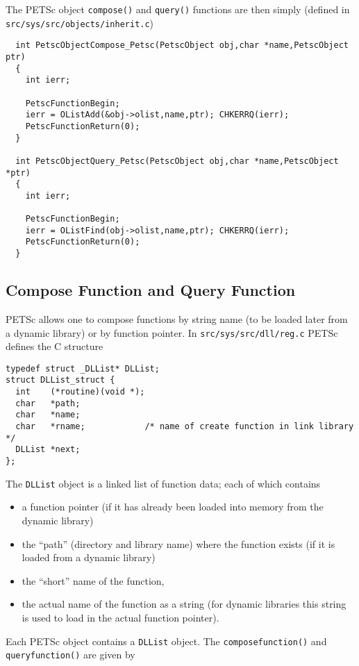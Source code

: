 The PETSc object {\tt compose()} and {\tt query()} functions are then simply
(defined in {\tt src/sys/src/objects/inherit.c})
\begin{verbatim}
  int PetscObjectCompose_Petsc(PetscObject obj,char *name,PetscObject ptr)
  {
    int ierr;

    PetscFunctionBegin;
    ierr = OListAdd(&obj->olist,name,ptr); CHKERRQ(ierr);
    PetscFunctionReturn(0);
  }

  int PetscObjectQuery_Petsc(PetscObject obj,char *name,PetscObject *ptr)
  {
    int ierr;

    PetscFunctionBegin;
    ierr = OListFind(obj->olist,name,ptr); CHKERRQ(ierr);
    PetscFunctionReturn(0); 
  }
\end{verbatim}

\subsection{Compose Function and Query Function}

PETSc allows one to compose functions by string name (to be loaded later from 
a dynamic library) or by function pointer. In {\tt src/sys/src/dll/reg.c}
PETSc defines the C structure

\begin{verbatim}
typedef struct _DLList* DLList;
struct DLList_struct {
  int    (*routine)(void *);
  char   *path;
  char   *name;               
  char   *rname;            /* name of create function in link library */
  DLList *next;
};
\end{verbatim}

The {\tt DLList} object is a linked list of function data; each 
of which contains
\begin{itemize}
\item a function pointer (if it has already been loaded into memory from the dynamic library)
\item the ``path'' (directory and library name) where the function exists (if it is 
      loaded from a dynamic library)
\item the ``short'' name of the function,
\item the actual name of the function as a string (for dynamic libraries this string is used
      to load in the actual function pointer).
\end{itemize}

Each PETSc object contains a {\tt DLList} object. The {\tt composefunction()} and 
{\tt queryfunction()} are given by 

